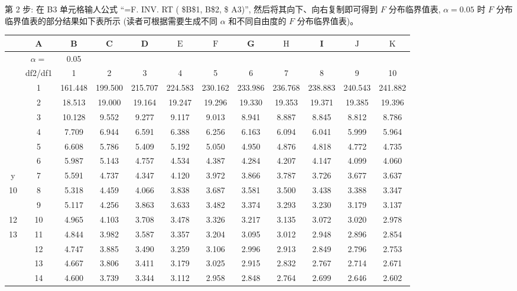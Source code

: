 \documentclass[10pt]{article}
\begin{document}
\begin{CJK*}{UTF8}{bsmi}
第 2 步: 在 B3 单元格输人公式 “=F. INV. RT ( \$B\$1, B\$2, \$ A3)”, 然后将其向下、向右复制即可得到 $F$ 分布临界值表, $\alpha=0.05$ 时 $F$ 分布临界值表的部分结果如下表所示 (读者可根据需要生成不同 $\alpha$ 和不同自由度的 $F$ 分布临界值表)。

\begin{center}
\begin{tabular}{|c|c|c|c|c|c|c|c|c|c|c|c|}
\hline
 & A & B & C & D & $\mathrm{E}$ & $\mathrm{F}$ & G & $\mathrm{H}$ & I & $\mathrm{J}$ & $\mathrm{K}$ \\
\hline
 & $\alpha=$ & 0.05 &  &  &  &  &  &  &  &  &  \\
\hline
 & df2/df1 & 1 & 2 & 3 & 4 & 5 & 6 & 7 & 8 & 9 & 10 \\
\hline
 & 1 & 161.448 & 199.500 & 215.707 & 224.583 & 230.162 & 233.986 & 236.768 & 238.883 & 240.543 & 241.882 \\
\hline
 & 2 & 18.513 & 19.000 & 19.164 & 19.247 & 19.296 & 19.330 & 19.353 & 19.371 & 19.385 & 19.396 \\
\hline
 & 3 & 10.128 & 9.552 & 9.277 & 9.117 & 9.013 & 8.941 & 8.887 & 8.845 & 8.812 & 8.786 \\
\hline
 & 4 & 7.709 & 6.944 & 6.591 & 6.388 & 6.256 & 6.163 & 6.094 & 6.041 & 5.999 & 5.964 \\
\hline
 & 5 & 6.608 & 5.786 & 5.409 & 5.192 & 5.050 & 4.950 & 4.876 & 4.818 & 4.772 & 4.735 \\
\hline
 & 6 & 5.987 & 5.143 & 4.757 & 4.534 & 4.387 & 4.284 & 4.207 & 4.147 & 4.099 & 4.060 \\
\hline
y & 7 & 5.591 & 4.737 & 4.347 & 4.120 & 3.972 & 3.866 & 3.787 & 3.726 & 3.677 & 3.637 \\
\hline
10 & 8 & 5.318 & 4.459 & 4.066 & 3.838 & 3.687 & 3.581 & 3.500 & 3.438 & 3.388 & 3.347 \\
\hline
 & 9 & 5.117 & 4.256 & 3.863 & 3.633 & 3.482 & 3.374 & 3.293 & 3.230 & 3.179 & 3.137 \\
\hline
12 & 10 & 4.965 & 4.103 & 3.708 & 3.478 & 3.326 & 3.217 & 3.135 & 3.072 & 3.020 & 2.978 \\
\hline
13 & 11 & 4.844 & 3.982 & 3.587 & 3.357 & 3.204 & 3.095 & 3.012 & 2.948 & 2.896 & 2.854 \\
\hline
 & 12 & 4.747 & 3.885 & 3.490 & 3.259 & 3.106 & 2.996 & 2.913 & 2.849 & 2.796 & 2.753 \\
\hline
 & 13 & 4.667 & 3.806 & 3.411 & 3.179 & 3.025 & 2.915 & 2.832 & 2.767 & 2.714 & 2.671 \\
\hline
 & 14 & 4.600 & 3.739 & 3.344 & 3.112 & 2.958 & 2.848 & 2.764 & 2.699 & 2.646 & 2.602 \\

\end{tabular}
\end{center}
\end{CJK*}
\end{document}
